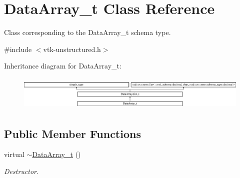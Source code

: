 \hypertarget{classDataArray__t}{\section{Data\+Array\+\_\+t Class Reference}
\label{classDataArray__t}
}


Class corresponding to the Data\+Array\+\_\+t schema type.  




{\ttfamily \#include $<$vtk-\/unstructured.\+h$>$}

Inheritance diagram for Data\+Array\+\_\+t\+:\begin{figure}[H]
\begin{center}
\leavevmode
\includegraphics[height=1.660079cm]{classDataArray__t}
\end{center}
\end{figure}
\subsection*{Public Member Functions}
\begin{DoxyCompactItemize}
\item 
virtual \hyperlink{classDataArray__t_ac9806a5eedf7abecd7adf6408c8af894}{$\sim$\+Data\+Array\+\_\+t} ()
\begin{DoxyCompactList}\small\item\em Destructor. \end{DoxyCompactList}\end{DoxyCompactItemize}
